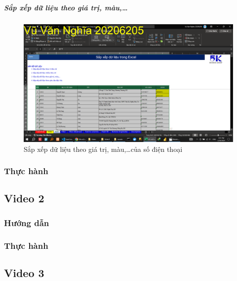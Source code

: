 \documentclass{article}
\begin{document}
\subparagraph{Sắp xếp dữ liệu theo giá trị, màu,\dots}
\begin{figure}[h]
    \centering
    \includegraphics[scale = 0.15]{Video1/HuongDan/3.png}
    \caption{Sắp xếp dữ liệu theo  giá trị, màu,\dots của số điện thoại}
\end{figure}












\subsubsection{Thực hành}



\subsection{Video 2}
\subsubsection{Hướng dẫn}

\subsubsection{Thực hành}




\subsection{Video 3}
\end{document}
